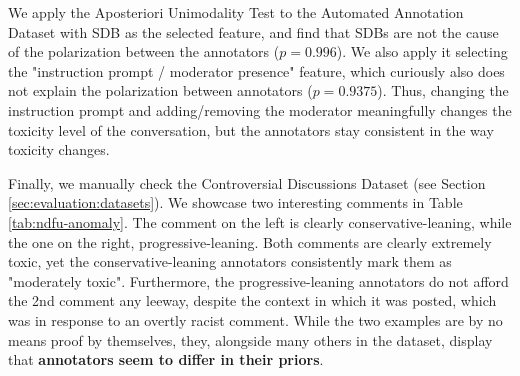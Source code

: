 We apply the Aposteriori Unimodality Test to the Automated Annotation Dataset with \ac{SDB} as the selected feature, and find that \acp{SDB} are not the cause of the polarization between the annotators ($p=0.996$). We also apply it selecting the "instruction prompt / moderator presence" feature, which curiously also does not explain the polarization between annotators ($p=0.9375$). Thus, changing the instruction prompt and adding/removing the moderator meaningfully changes the toxicity level of the conversation, but the annotators stay consistent in the way toxicity changes.


Finally, we manually check the Controversial Discussions Dataset (see Section \ref{sec:evaluation:datasets}). We showcase two interesting comments in Table \ref{tab:ndfu-anomaly}. The comment on the left is clearly conservative-leaning, while the one on the right, progressive-leaning. Both comments are clearly extremely toxic, yet the conservative-leaning annotators consistently mark them as "moderately toxic". Furthermore, the progressive-leaning annotators do not afford the 2nd comment any leeway, despite the context in which it was posted, which was in response to an overtly racist comment. While the two examples are by no means proof by themselves, they, alongside many others in the dataset, display that \textbf{annotators seem to differ in their priors}.


